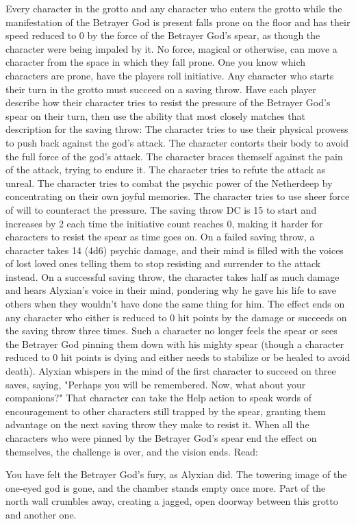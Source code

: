 \documentclass[10pt,a4,twoside,twocolumn,openany,nodeprecatedcode]{dndbook}
\begin{document}
Every character in the grotto and any character who enters the grotto while the manifestation of the Betrayer God is present falls prone on the floor and has their speed reduced to 0 by the force of the Betrayer God's spear, as though the character were being impaled by it. No force, magical or otherwise, can move a character from the space in which they fall prone.
One you know which characters are prone, have the players roll initiative. Any character who starts their turn in the grotto must succeed on a saving throw. Have each player describe how their character tries to resist the pressure of the Betrayer God's spear on their turn, then use the ability that most closely matches that description for the saving throw:
{{The character tries to use their physical prowess to push back against the god's attack.}}
{{The character contorts their body to avoid the full force of the god's attack.}}
{{The character braces themself against the pain of the attack, trying to endure it.}}
{{The character tries to refute the attack as unreal.}}
{{The character tries to combat the psychic power of the Netherdeep by concentrating on their own joyful memories.}}
{{The character tries to use sheer force of will to counteract the pressure.}}
The saving throw DC is 15 to start and increases by 2 each time the initiative count reaches 0, making it harder for characters to resist the spear as time goes on. On a failed saving throw, a character takes 14 (4d6) psychic damage, and their mind is filled with the voices of lost loved ones telling them to stop resisting and surrender to the attack instead. On a successful saving throw, the character takes half as much damage and hears Alyxian's voice in their mind, pondering why he gave his life to save others when they wouldn't have done the same thing for him. The effect ends on any character who either is reduced to 0 hit points by the damage or succeeds on the saving throw three times. Such a character no longer feels the spear or sees the Betrayer God pinning them down with his mighty spear (though a character reduced to 0 hit points is dying and either needs to stabilize or be healed to avoid death).
Alyxian whispers in the mind of the first character to succeed on three saves, saying, "Perhaps you will be remembered. Now, what about your companions?" That character can take the Help action to speak words of encouragement to other characters still trapped by the spear, granting them advantage on the next saving throw they make to resist it.
When all the characters who were pinned by the Betrayer God's spear end the effect on themselves, the challenge is over, and the vision ends. Read:
\begin{DndReadAloud}{}
You have felt the Betrayer God's fury, as Alyxian did. The towering image of the one-eyed god is gone, and the chamber stands empty once more. Part of the north wall crumbles away, creating a jagged, open doorway between this grotto and another one.
\end{DndReadAloud}
\end{document}
